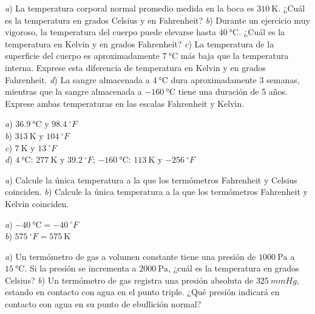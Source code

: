 \setcounter{figure}{0}
%
\begin{Exercise}
  \textit{a}) La temperatura corporal normal promedio medida en la boca es $\SI{310}{\kelvin}$. ¿Cuál es la temperatura en grados Celsius y en Fahrenheit? \textit{b}) Durante un ejercicio muy vigoroso, la temperatura del cuerpo puede elevarse hasta $\SI{40}{\celsius}$. ¿Cuál es la temperatura en Kelvin y en grados Fahrenheit? \textit{c}) La temperatura de la superficie del cuerpo es aproximadamente $\SI{7}{\celsius}$ más baja que la temperatura interna. Exprese esta diferencia de temperatura en Kelvin y en grados Fahrenheit. \textit{d}) La sangre almacenada a $\SI{4}{\celsius}$ dura aproximadamente 3 semanas, mientras que la sangre almacenada a $\SI{-160}{\celsius}$ tiene una duración de 5 años. Exprese ambas temperaturas en las escalas Fahrenheit y Kelvin.
\end{Exercise}
\begin{Answer}
	\begin{minipage}[t]{.4\textwidth}
    \textit{a}) $\SI{36.9}{\celsius}$ y $\SI{98.4}{^\circ F}$\\ \textit{b}) $\SI{313}{\kelvin}$ y $\SI{104}{^\circ F}$\\ \textit{c}) $\SI{7}{\kelvin}$ y $\SI{13}{^\circ F}$\\ \textit{d}) $\SI{4}{\celsius}$: $\SI{277}{\kelvin}$ y $\SI{39.2}{^\circ F}$; $\SI{-160}{\celsius}$: $\SI{113}{\kelvin}$ y $\SI{-256}{^\circ F}$
  \end{minipage}
\end{Answer}
%
\begin{Exercise}
  \textit{a}) Calcule la única temperatura a la que los termómetros Fahrenheit y Celsius coinciden. \textit{b}) Calcule la única temperatura a la que los termómetros Fahrenheit y Kelvin coinciden.
\end{Exercise}
\begin{Answer}
	\begin{minipage}[t]{.4\textwidth}
    \textit{a}) $\SI{-40}{\celsius}=\SI{-40}{^\circ F}$\\ \textit{b}) $\SI{575}{^\circ F}=\SI{575}{\kelvin}$
  \end{minipage}
\end{Answer}
%
\begin{Exercise}
  \textit{a}) Un termómetro de gas a volumen constante tiene una presión de $\SI{1000}{\pascal}$ a $\SI{15}{\celsius}$. Si la presión se incrementa a $\SI{2000}{\pascal}$, ¿cuál es la temperatura en grados Celsius? \textit{b}) Un termómetro de gas registra una presión absoluta de $\SI{325}{mmHg}$, estando en contacto con agua en el punto triple. ¿Qué presión indicará en contacto con agua en su punto de ebullición normal?
\end{Exercise}
